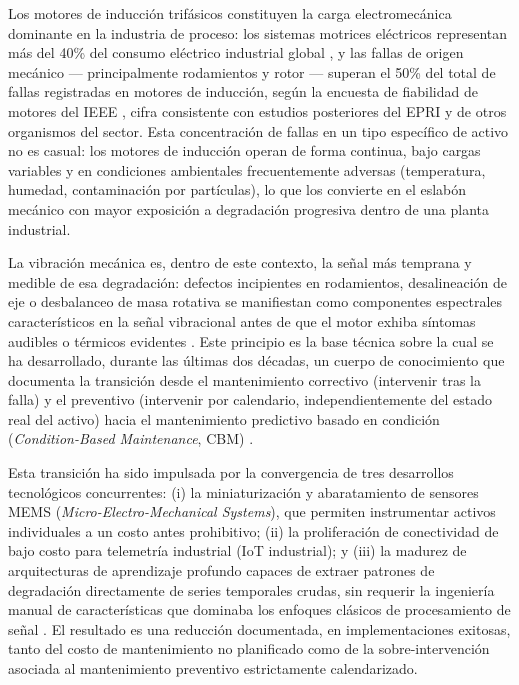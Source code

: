\documentclass[11pt]{article}
\begin{document}
Los motores de inducción trifásicos constituyen la carga electromecánica dominante en la industria de proceso: los sistemas motrices eléctricos representan más del 40\% del consumo eléctrico industrial global \citep{waide2011}, y las fallas de origen mecánico --- principalmente rodamientos y rotor --- superan el 50\% del total de fallas registradas en motores de inducción, según la encuesta de fiabilidad de motores del IEEE \citep{ieee1985motorreliability}, cifra consistente con estudios posteriores del EPRI y de otros organismos del sector. Esta concentración de fallas en un tipo específico de activo no es casual: los motores de inducción operan de forma continua, bajo cargas variables y en condiciones ambientales frecuentemente adversas (temperatura, humedad, contaminación por partículas), lo que los convierte en el eslabón mecánico con mayor exposición a degradación progresiva dentro de una planta industrial.

La vibración mecánica es, dentro de este contexto, la señal más temprana y medible de esa degradación: defectos incipientes en rodamientos, desalineación de eje o desbalanceo de masa rotativa se manifiestan como componentes espectrales característicos en la señal vibracional antes de que el motor exhiba síntomas audibles o térmicos evidentes \citep{tiboni2022}. Este principio es la base técnica sobre la cual se ha desarrollado, durante las últimas dos décadas, un cuerpo de conocimiento que documenta la transición desde el mantenimiento correctivo (intervenir tras la falla) y el preventivo (intervenir por calendario, independientemente del estado real del activo) hacia el mantenimiento predictivo basado en condición (\textit{Condition-Based Maintenance}, CBM) \citep{achouch2022}.

Esta transición ha sido impulsada por la convergencia de tres desarrollos tecnológicos concurrentes: (i) la miniaturización y abaratamiento de sensores MEMS (\textit{Micro-Electro-Mechanical Systems}), que permiten instrumentar activos individuales a un costo antes prohibitivo; (ii) la proliferación de conectividad de bajo costo para telemetría industrial (IoT industrial); y (iii) la madurez de arquitecturas de aprendizaje profundo capaces de extraer patrones de degradación directamente de series temporales crudas, sin requerir la ingeniería manual de características que dominaba los enfoques clásicos de procesamiento de señal \citep{achouch2022}. El resultado es una reducción documentada, en implementaciones exitosas, tanto del costo de mantenimiento no planificado como de la sobre-intervención asociada al mantenimiento preventivo estrictamente calendarizado.
\end{document}
